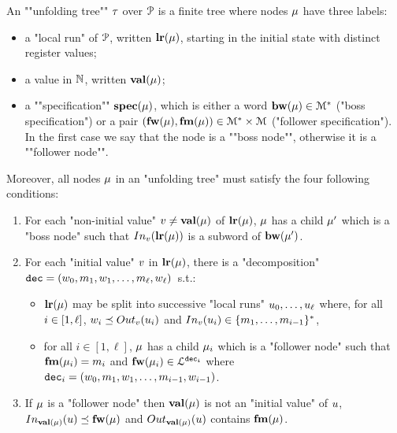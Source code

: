 \begin{definition}
\label{def:unfolding_tree}
\AP An ""unfolding tree"" $\tau$ over $\mathcal{P}$ is
a finite tree where nodes $\mu$ have three labels:
\begin{itemize}
	\item a "local run" of $\mathcal{P}$, written $\mathbf{lr}(\mu)$, starting in the initial state with distinct register values;
	
	\item a value in $\mathbb{N}$, written $\mathbf{val}(\mu)$;
	
	\item a ""specification"" $\mathbf{spec}(\mu)$, which is either a word $\mathbf{bw}(\mu) \in \mathcal{M}^*$ ("boss specification") or a pair $(\mathbf{fw}(\mu), \mathbf{fm}(\mu)) \in \mathcal{M}^* \times \mathcal{M}$ ("follower specification"). In the first case we say that the node is a ""boss node"", otherwise it is a ""follower node"".
\end{itemize} 
Moreover, all nodes $\mu$ in an "unfolding tree" must satisfy the four following conditions:
\begin{enumerate}[label= (\roman*), ref=(\roman*)]
	\item \label{item:condition1_non_initial_value} For each "non-initial value" $v \ne \mathbf{val}(\mu)$ of $\mathbf{lr}(\mu)$, $\mu$ has a child $\mu'$ which is a "boss node" such that $\vinput{\aval}{\localrunlabel{\node}}$ is a subword of $\mathbf{bw}(\mu')$.
	
	\item \label{item:condition2_initial_value} For each "initial value" $v$ in $\mathbf{lr}(\mu)$, there is a "decomposition" $\mathtt{dec} = (w_0, m_1, w_1, \ldots, m_{\ell}, w_{\ell})$~s.t.:
	\begin{itemize}
		\item $\mathbf{lr}(\mu)$ may be split into successive "local runs" $u_0, \dots, u_{\ell}$ where, for all $i \in [1,\ell]$, $w_i \subword \voutput{\aval}{\localrun_i}$ and $\vinput{\aval}{\localrun_i} \in \set{m_1, \dots, m_{i-1}}^*$,
		\item for all $i \in [1,\ell]$, $\mu$ has a child $\mu_i$ which is a "follower node" such that $\mathbf{fm}(\mu_i) = m_i$ and $\mathbf{fw}(\mu_i) \in\mathcal{L}^{\mathtt{\mathtt{dec}_i}}$ where $\mathtt{dec}_i = (w_0, m_1, w_1, \ldots, m_{i-1}, w_{i-1})$.	\end{itemize}
	
	\item \label{item:condition3_follower_node} If $\mu$ is a "follower node" then $\mathbf{val}(\mu)$ is not an "initial value" of $u$, $\vinput{\valuelabel{\node}}{\localrun} \subword \followlabelword{\node}$ and 
	$\voutput{\valuelabel{\node}}{\localrun}$ contains $\mathbf{fm}(\mu)$.


\end{enumerate}
\end{definition}
